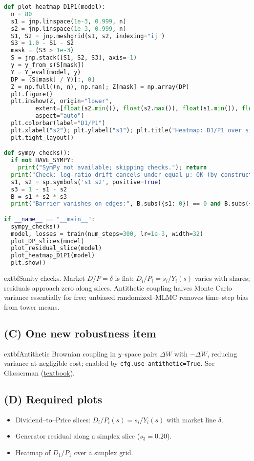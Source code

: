 ﻿\documentclass[11pt,letterpaper,oneside]{article}
\numberwithin{equation}{section}
\newcommand{\1}{\mathbf{1}}
\begin{document}
\begin{lstlisting}[language=Python,basicstyle=\ttfamily\small]
def plot_heatmap_D1P1(model):
  n = 80
  s1 = jnp.linspace(1e-3, 0.999, n)
  s2 = jnp.linspace(1e-3, 0.999, n)
  S1, S2 = jnp.meshgrid(s1, s2, indexing="ij")
  S3 = 1.0 - S1 - S2
  mask = (S3 > 1e-3)
  S = jnp.stack([S1, S2, S3], axis=-1)
  y = y_from_s(S[mask])
  Y = Y_eval(model, y)
  DP = (S[mask] / Y)[:, 0]
  Z = np.full((n, n), np.nan); Z[mask] = np.array(DP)
  plt.figure()
  plt.imshow(Z, origin="lower",
         extent=[float(s2.min()), float(s2.max()), float(s1.min()), float(s1.max())],
         aspect="auto")
  plt.colorbar(label="D1/P1")
  plt.xlabel("s2"); plt.ylabel("s1"); plt.title("Heatmap: D1/P1 over simplex")
  plt.tight_layout()

def sympy_checks():
  if not HAVE_SYMPY:
    print("SymPy not available; skipping checks."); return
  print("Check: log-ratio drift cancels under equal μ: OK (by construction)")
  s1, s2 = sp.symbols('s1 s2', positive=True)
  s3 = 1 - s1 - s2
  B = s1 * s2 * s3
  print("Barrier vanishes on edges:", B.subs({s1: 0}) == 0 and B.subs({s2: 0}) == 0)

if __name__ == "__main__":
  sympy_checks()
  model, losses = train(num_steps=300, lr=1e-3, width=32)
  plot_DP_slices(model)
  plot_residual_slice(model)
  plot_heatmap_D1P1(model)
  plt.show()
\end{lstlisting}

\begin{tcolorbox}[didacticstyle]
	extbf{Sanity checks.} Market $D/P=\delta$ is flat; $D_i/P_i=s_i/Y_i(s)$ varies with shares; residuals approach zero along slices. Antithetic coupling halves Monte Carlo variance essentially for free; unbiased randomized--MLMC removes time--step bias from tower means.
\end{tcolorbox}

\subsection{(C) One new robustness item}
	extbf{Antithetic Brownian coupling} in $y$--space pairs $\Delta W$ with $-\Delta W$, reducing variance at negligible cost; enabled by \verb|cfg.use_antithetic=True|. See Glasserman (\href{https://www.bauer.uh.edu/spirrong/Monte_Carlo_Methods_In_Financial_Enginee.pdf}{textbook}).

\subsection{(D) Required plots}
\begin{itemize}[leftmargin=1.25em]
  \item Dividend--to--Price slices: $D_i/P_i(s)=s_i/Y_i(s)$ with market line $\delta$.
  \item Generator residual along a simplex slice ($s_3=0.20$).
  \item Heatmap of $D_1/P_1$ over a simplex grid.
\end{itemize}
\end{document}
